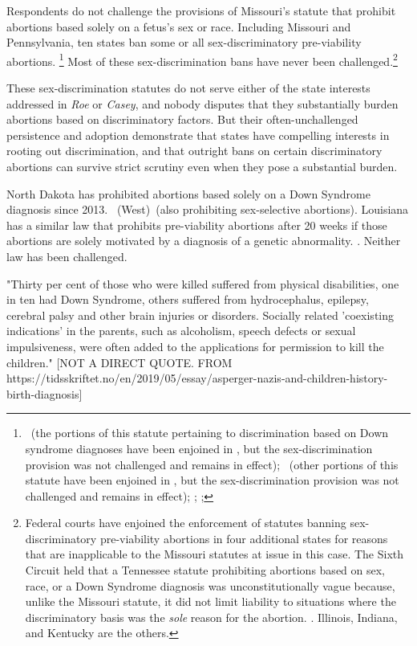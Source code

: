 \documentclass[12pt,\documentclassflag]{SCOTUS_Brief}
\begin{document}
Respondents do not challenge the provisions of Missouri’s statute that prohibit abortions based solely on a fetus’s sex or race. Including Missouri and Pennsylvania, ten states ban some or all sex-discriminatory pre-viability abortions. \footnote{\See {}~(the portions of this statute pertaining to discrimination based on Down syndrome diagnoses have been enjoined in \cite{Isaacson}, but the sex-discrimination provision was not challenged and remains in effect); ~(other portions of this statute have been enjoined in \cite{Hopkins}, but the sex-discrimination provision was not challenged and remains in effect); ; ; } Most of these sex-discrimination bans have never been challenged.\footnote{Federal courts have enjoined the enforcement of statutes banning sex-discriminatory pre-viability abortions in four additional states for reasons that are inapplicable to the Missouri statutes at issue in this case. The Sixth Circuit held that a Tennessee statute prohibiting abortions based on sex, race, or a Down Syndrome diagnosis was unconstitutionally vague because, unlike the Missouri statute, it did not limit liability to situations where the discriminatory basis was the \textit{sole} reason for the abortion. \Seegenerally \cite{Memphis}. Illinois, Indiana, and Kentucky are the others.}

These sex-discrimination statutes do not serve either of the state interests addressed in \textit{Roe} or \textit{Casey}, and nobody disputes that they substantially burden abortions based on discriminatory factors. But their often-unchallenged persistence and adoption demonstrate that states have compelling interests in rooting out discrimination, and that outright bans on certain discriminatory abortions can survive strict scrutiny even when they pose a substantial burden.

North Dakota has prohibited abortions based solely on a Down Syndrome diagnosis since 2013.  ~(West)~(also prohibiting sex-selective abortions). Louisiana has a similar law that prohibits pre-viability abortions after 20 weeks if those abortions are solely motivated by a diagnosis of a genetic abnormality. . Neither law has been challenged.

"Thirty per cent of those who were killed suffered from physical disabilities, one in ten had Down Syndrome, others suffered from hydrocephalus, epilepsy, cerebral palsy and other brain injuries or disorders. Socially related 'coexisting indications' in the parents, such as alcoholism, speech defects or sexual impulsiveness, were often added to the applications for permission to kill the children."  [NOT A DIRECT QUOTE. FROM https://tidsskriftet.no/en/2019/05/essay/asperger-nazis-and-children-history-birth-diagnosis]
\end{document}
